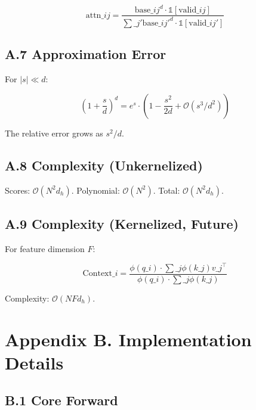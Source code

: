 \[
\text{attn}\_{ij} = \frac{\text{base}\_{ij}^d \cdot \mathbb{1}[\text{valid}\_{ij}]}{\sum\_{j'} \text{base}\_{ij'}^d \cdot \mathbb{1}[\text{valid}\_{ij'}]}
\tag{A.7}
\]

\subsection{A.7 Approximation Error}

For $|s| \ll d$:

\[
\left(1 + \frac{s}{d}\right)^d = e^s \cdot \left(1 - \frac{s^2}{2d} + \mathcal{O}(s^3/d^2)\right)
\tag{A.8}
\]

The relative error grows as $s^2/d$.

\subsection{A.8 Complexity (Unkernelized)}

Scores: $\mathcal{O}(N^2 d_h)$.
Polynomial: $\mathcal{O}(N^2)$.
Total: $\mathcal{O}(N^2 d_h)$.

\subsection{A.9 Complexity (Kernelized, Future)}

For feature dimension $F$:

\[
\text{Context}\_i = \frac{\phi(q\_i) \cdot \sum\_j \phi(k\_j) v\_j^\top}{\phi(q\_i) \cdot \sum\_j \phi(k\_j)}
\tag{A.9}
\]

Complexity: $\mathcal{O}(N F d_h)$.



\section{Appendix B. Implementation Details}

\subsection{B.1 Core Forward}

